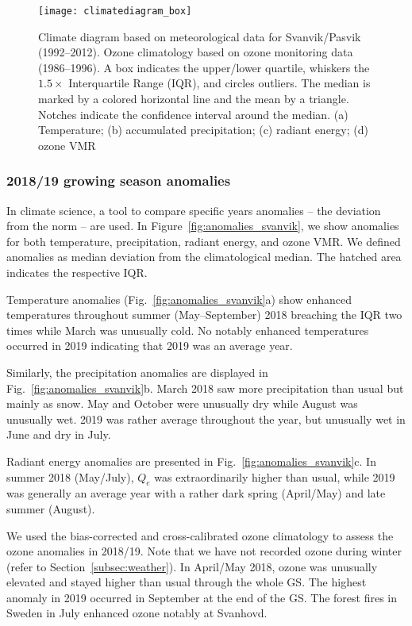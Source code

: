 \documentclass[bg, manuscript]{copernicus}
\begin{document}
\begin{figure*}[t]
  \texttt{[image: climatediagram\_box]}
  \caption{Climate diagram based on meteorological data for Svanvik/Pasvik (1992--2012). Ozone climatology based on ozone monitoring data (1986--1996). A box indicates the upper/lower quartile, whiskers the $1.5\times$ Interquartile Range (IQR), and circles outliers. The median is marked by a colored horizontal line and the mean by a triangle. Notches indicate the confidence interval around the median. (a) Temperature; (b) accumulated precipitation; (c) radiant energy; (d) ozone VMR}
  \label{fig:climatediagram}
\end{figure*}

\subsubsection{2018/19 growing season anomalies}
\label{subsec:anomalies}

In climate science, a tool to compare specific years anomalies -- the deviation from the norm --  are used. In Figure~\ref{fig:anomalies_svanvik}, we show anomalies for both temperature, precipitation, radiant energy, and ozone VMR. We defined anomalies as median deviation from the climatological median. The hatched area indicates the respective IQR.

Temperature anomalies (Fig.~\ref{fig:anomalies_svanvik}a) show enhanced temperatures throughout summer (May--September) 2018 breaching the IQR two times while March was unusually cold. No notably enhanced temperatures occurred in 2019 indicating that 2019 was an average year.

Similarly, the precipitation anomalies are displayed in Fig.~\ref{fig:anomalies_svanvik}b. March 2018 saw more precipitation than usual but mainly as snow. May and October were unusually dry while August was unusually wet. 2019 was rather average throughout the year, but unusually wet in June and dry in July.

Radiant energy anomalies are presented in Fig.~\ref{fig:anomalies_svanvik}c. In summer 2018 (May/July), $Q_e$ was extraordinarily higher than usual, while 2019 was generally an average year with a rather dark spring (April/May) and late summer (August).

We used the bias-corrected and cross-calibrated ozone climatology \citep{ACP:Falk2021} to assess the ozone anomalies in 2018/19. Note that we have not recorded ozone during winter (refer to Section~\ref{subsec:weather}). In April/May 2018, ozone was unusually elevated and stayed higher than usual through the whole GS. The highest anomaly in 2019 occurred in September at the end of the GS. The forest fires in Sweden in July enhanced ozone notably at Svanhovd.
\end{document}
